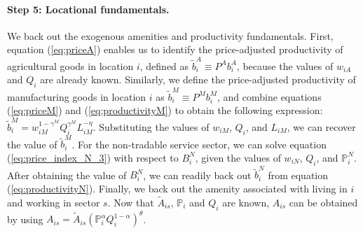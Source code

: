 \documentclass[12pt, unicode, a4paper]{article}
\newcommand{\1}{\mbox{1}\hspace{-0.25em}\mbox{l}} %
\begin{document}
\paragraph{Step 5: Locational fundamentals.}
We back out the exogenous amenities and productivity fundamentals. First, 
equation (\ref{eq:priceA}) enables us to identify the price-adjusted productivity of agricultural goods in location $i$, defined as $\widetilde{b}_i^A \equiv P^A b_i^A$, because the values of $w_{iA}$ and $Q_i$ are already known.
Similarly, we define the price-adjusted productivity of manufacturing goods in location $i$ as $\widetilde{b}_i^M \equiv P^M b_i^M$, and combine equations (\ref{eq:priceM}) and (\ref{eq:productivityM}) to obtain the following expression: $\widetilde{b}_i^M=w_{iM}^{1-\gamma^M}Q_i^{\gamma^M}L_{iM}^{-\eta}$. Substituting the values of $w_{iM}$, $Q_i$, and $L_{iM}$, we can recover the value of $\widetilde{b}_i^M$.
For the non-tradable service sector, we can solve equation (\ref{eq:price_index_N_3}) with respect to $B_i^N$, given the values of $w_{iN}$, $Q_i$, and $\mathbb{P}_i^N$. After obtaining the value of $B_i^N$, we can readily back out $\widetilde{b}_i^N$ from equation (\ref{eq:productivityN}).
Finally, we back out the amenity associated with living in $i$ and working in sector $s$. Now that $\widetilde{A}_{is}$, $\mathbb{P}_i$ and $Q_i$ are known, $A_{is}$ can be obtained by using $A_{is}=\widetilde{A}_{is}\left(\mathbb{P}_{i}^{\alpha}Q_i^{1-\alpha}\right)^\theta$.
\end{document}
